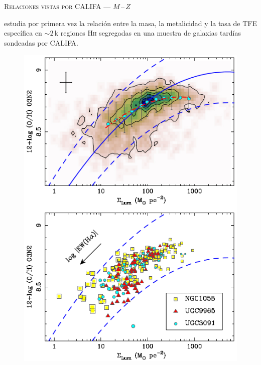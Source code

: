 \documentclass[xcolor=dvipsnames,4pt,hyperref={colorlinks,citecolor=black,linkcolor=black,urlcolor=black}]{beamer}
\begin{document}
\begin{frame}{\textsc{Relaciones vistas por CALIFA --- $M\,$--$\,Z$}}

\citet{Rosales2012} estudia por primera vez la relación entre la masa, la metalicidad y la tasa de
TFE específica en $\sim2\,$k regiones H\textsc{ii} segregadas en una muestra de galaxias tardías
sondeadas por CALIFA.
\begin{figure}
\includegraphics[scale=1]{img/rosales-ortega2012-1}
\end{figure}
\end{frame}
\end{document}
